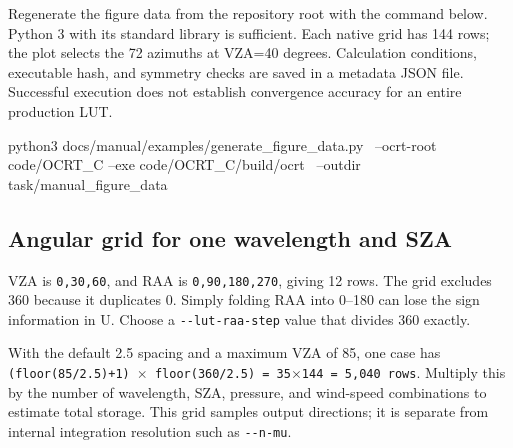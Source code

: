 Regenerate the figure data from the repository root with the command below. Python 3 with its standard library is sufficient. Each native grid has 144 rows; the plot selects the 72 azimuths at VZA=40 degrees. Calculation conditions, executable hash, and symmetry checks are saved in a metadata JSON file. Successful execution does not establish convergence accuracy for an entire production LUT.
\par\noindent\begin{minipage}{\linewidth}
\begin{ManualCode}
python3 docs/manual/examples/generate_figure_data.py \
  --ocrt-root code/OCRT_C --exe code/OCRT_C/build/ocrt \
  --outdir task/manual_figure_data
\end{ManualCode}
\end{minipage}\par

\subsection{Angular grid for one wavelength and SZA}
\label{sec:auto:04_examples:3.2}

\par\noindent\begin{minipage}{\linewidth}
\end{minipage}\par

VZA is \texttt{0,\allowbreak{}30,\allowbreak{}60\textdegree{}}, and RAA is \texttt{0,\allowbreak{}90,\allowbreak{}180,\allowbreak{}270\textdegree{}}, giving 12 rows. The grid excludes 360\textdegree{} because it duplicates 0\textdegree{}. Simply folding RAA into 0--180\textdegree{} can lose the sign information in U. Choose a \texttt{-\allowbreak{}-\allowbreak{}lut-\allowbreak{}raa-\allowbreak{}step} value that divides 360 exactly.

With the default 2.5\textdegree{} spacing and a maximum VZA of 85\textdegree{}, one case has \texttt{(floor(85/\allowbreak{}2.\allowbreak{}5)+1) \ensuremath{\times} floor(36\allowbreak{}0/\allowbreak{}2.\allowbreak{}5) =\allowbreak{} 35\ensuremath{\times}144 =\allowbreak{} 5,\allowbreak{}040 rows}. Multiply this by the number of wavelength, SZA, pressure, and wind-speed combinations to estimate total storage. This grid samples output directions; it is separate from internal integration resolution such as \texttt{-\allowbreak{}-\allowbreak{}n-\allowbreak{}mu}.

